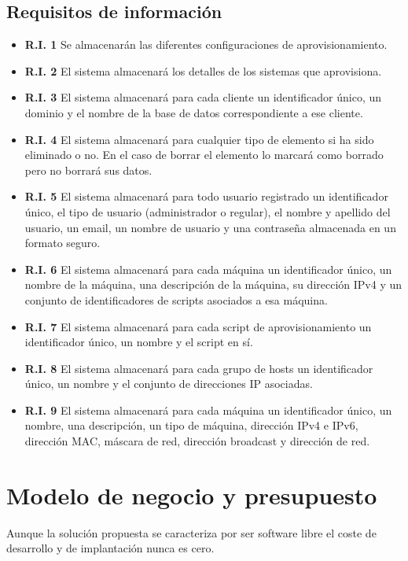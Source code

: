 \subsection{Requisitos de información}
\begin{itemize}
	\item \textbf{R.I. 1} Se almacenarán las diferentes configuraciones de aprovisionamiento.
	\item \textbf{R.I. 2} El sistema almacenará los detalles de los sistemas que aprovisiona.
	\item \textbf{R.I. 3} El sistema almacenará para cada cliente un identificador único, un dominio y el nombre de la base de datos correspondiente a ese cliente.
	\item \textbf{R.I. 4} El sistema almacenará para cualquier tipo de elemento si ha sido eliminado o no. En el caso de borrar el elemento lo marcará como borrado pero no borrará sus datos.
	\item \textbf{R.I. 5} El sistema almacenará para todo usuario registrado un identificador único, el tipo de usuario (administrador o regular), el nombre y apellido del usuario, un email, un nombre de usuario y una contraseña almacenada en un formato seguro.
	\item \textbf{R.I. 6} El sistema almacenará para cada máquina un identificador único, un nombre de la máquina, una descripción de la máquina, su dirección IPv4 y un conjunto de identificadores de scripts asociados a esa máquina.
	\item \textbf{R.I. 7} El sistema almacenará para cada script de aprovisionamiento un identificador único, un nombre y el script en sí.
	\item \textbf{R.I. 8} El sistema almacenará para cada grupo de hosts un identificador único, un nombre y el conjunto de direcciones IP asociadas.
	\item \textbf{R.I. 9} El sistema almacenará para cada máquina un identificador único, un nombre, una descripción, un tipo de máquina, dirección IPv4 e IPv6, dirección MAC, máscara de red, dirección broadcast y dirección de red.
\end{itemize}



\section{Modelo de negocio y presupuesto}

Aunque la solución propuesta se caracteriza por ser software libre el coste de desarrollo y de implantación nunca es cero.

